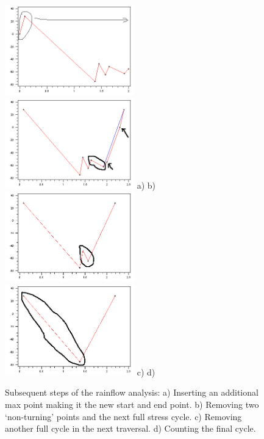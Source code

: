 \begin{figure}[t]
\includegraphics[width=0.5\textwidth]{Figures/LoaderRos9_pass1}
\includegraphics[width=0.5\textwidth]{Figures/LoaderRos9_pass2}
a) \textwidth b) \\[2mm]
\includegraphics[width=0.5\textwidth]{Figures/LoaderRos9_pass3}
\includegraphics[width=0.5\textwidth]{Figures/LoaderRos9_pass4}
c) \textwidth d)
\caption{Subsequent steps of the rainflow analysis:
a) Inserting an additional max point making it the new start and end point.
b) Removing two `non-turning' points and the next full stress cycle.
c) Removing another full cycle in the next traversal.
d) Counting the final cycle.}
\label{fig:Rainflow2}
\end{figure}

